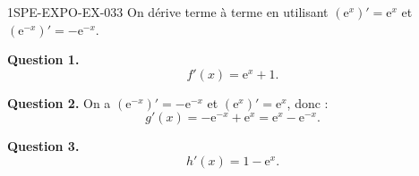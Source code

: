 \begin{corrige}{1SPE-EXPO-EX-033}
On dérive terme à terme en utilisant $(\mathrm{e}^{x})' = \mathrm{e}^{x}$ et $(\mathrm{e}^{-x})' = -\mathrm{e}^{-x}$.

\textbf{Question 1.}
\[f'(x) = \mathrm{e}^{x} + 1.\]

\textbf{Question 2.} On a $(\mathrm{e}^{-x})' = -\mathrm{e}^{-x}$ et $(\mathrm{e}^{x})' = \mathrm{e}^{x}$, donc :
\[g'(x) = -\mathrm{e}^{-x} + \mathrm{e}^{x} = \boxed{\mathrm{e}^{x} - \mathrm{e}^{-x}}.\]

\textbf{Question 3.}
\[h'(x) = 1 - \mathrm{e}^{x}.\]
\end{corrige}
